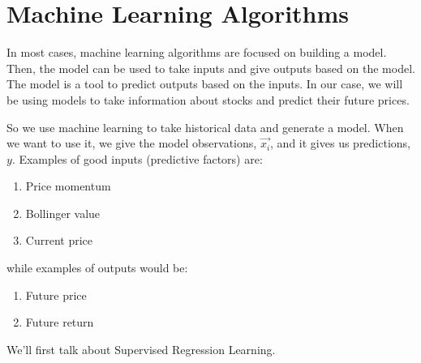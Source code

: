 \chapter{Machine Learning Algorithms}
\noindent In most cases, machine learning algorithms are focused on building a model. Then, the model can be used to take inputs and give outputs based on the model. The model is a tool to predict outputs based on the inputs. In our case, we will be using models to take information about stocks and predict their future prices.
\begin{figure}[h]
\centering
{}
\end{figure}

\noindent So we use machine learning to take historical data and generate a model. When we want to use it, we give the model observations, $\vec{x_i}$, and it gives us predictions, $y$. Examples of good inputs (predictive factors) are:
\begin{enumerate}
	\item Price momentum
    \item Bollinger value
    \item Current price
\end{enumerate}
\noindent while examples of outputs would be:
\begin{enumerate}
	\item Future price
    \item Future return
\end{enumerate}
\noindent We'll first talk about Supervised Regression Learning.

